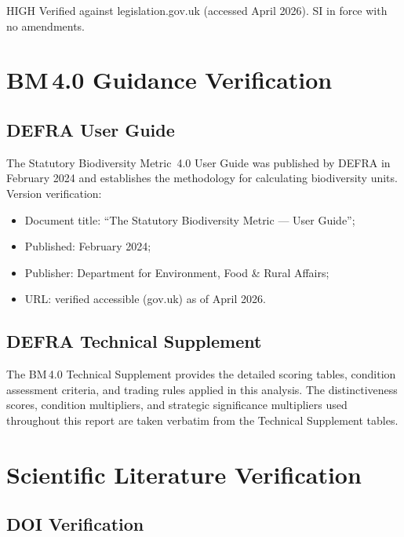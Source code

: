 \begin{confidencebox}{HIGH}
Verified against legislation.gov.uk (accessed April 2026). SI in force with no amendments.
\end{confidencebox}


\section{BM\,4.0 Guidance Verification}

\subsection{DEFRA User Guide}

The Statutory Biodiversity Metric~4.0 User Guide \citep{defra_bm4_user} was published by DEFRA in February 2024 and establishes the methodology for calculating biodiversity units. Version verification:

\begin{itemize}[nosep]
  \item Document title: ``The Statutory Biodiversity Metric — User Guide'';
  \item Published: February 2024;
  \item Publisher: Department for Environment, Food \& Rural Affairs;
  \item URL: verified accessible (gov.uk) as of April 2026.
\end{itemize}

\subsection{DEFRA Technical Supplement}

The BM\,4.0 Technical Supplement \citep{defra_bm4_tech} provides the detailed scoring tables, condition assessment criteria, and trading rules applied in this analysis. The distinctiveness scores, condition multipliers, and strategic significance multipliers used throughout this report are taken verbatim from the Technical Supplement tables.


\section{Scientific Literature Verification}

\subsection{DOI Verification}

